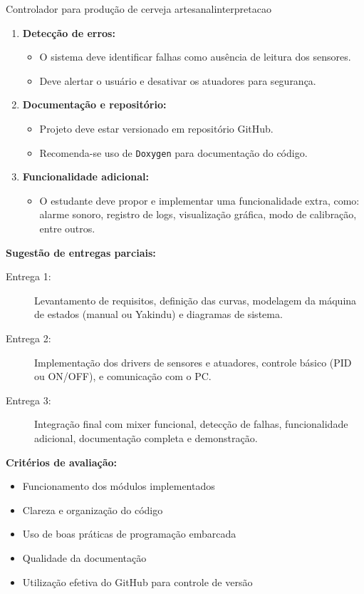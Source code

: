 \begin{problem}{Controlador para produção de cerveja artesanal}{interpretacao}
\begin{enumerate}
    \item \textbf{Detecção de erros:}
    \begin{itemize}
        \item O sistema deve identificar falhas como ausência de leitura dos sensores.
        \item Deve alertar o usuário e desativar os atuadores para segurança.
    \end{itemize}

    \item \textbf{Documentação e repositório:}
    \begin{itemize}
        \item Projeto deve estar versionado em repositório GitHub.
        \item Recomenda-se uso de \texttt{Doxygen} para documentação do código.
    \end{itemize}

    \item \textbf{Funcionalidade adicional:}
    \begin{itemize}
        \item O estudante deve propor e implementar uma funcionalidade extra, como: alarme sonoro, registro de logs, visualização gráfica, modo de calibração, entre outros.
    \end{itemize}
\end{enumerate}

\vspace{1ex}
\textbf{Sugestão de entregas parciais:}
\begin{description}
    \item[Entrega 1:] Levantamento de requisitos, definição das curvas, modelagem da máquina de estados (manual ou Yakindu) e diagramas de sistema.
    \item[Entrega 2:] Implementação dos drivers de sensores e atuadores, controle básico (PID ou ON/OFF), e comunicação com o PC.
    \item[Entrega 3:] Integração final com mixer funcional, detecção de falhas, funcionalidade adicional, documentação completa e demonstração.
\end{description}

\vspace{1ex}
\textbf{Critérios de avaliação:}
\begin{itemize}
    \item Funcionamento dos módulos implementados
    \item Clareza e organização do código
    \item Uso de boas práticas de programação embarcada
    \item Qualidade da documentação
    \item Utilização efetiva do GitHub para controle de versão
\end{itemize}


\end{problem}
